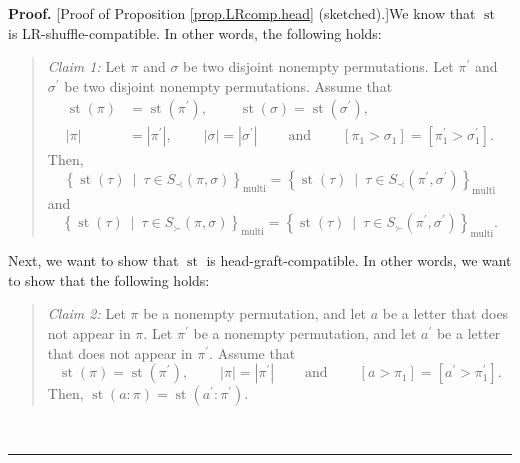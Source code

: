 \documentclass[numbers=enddot,12pt,final,onecolumn,notitlepage]{scrartcl}%
\theoremstyle{definition}
\newenvironment{statement}{\begin{quote}}{\end{quote}}
\newenvironment{proof}[1][Proof]{\noindent\textbf{#1.} }{\ \rule{0.5em}{0.5em}}
\newenvironment{verlong}{}{}
\begin{document}
\begin{verlong}
\begin{proof}
[Proof of Proposition \ref{prop.LRcomp.head} (sketched).]We know that
$\operatorname*{st}$ is LR-shuffle-compatible. In other words, the following holds:

\begin{statement}
\textit{Claim 1:} Let $\pi$ and $\sigma$ be two disjoint nonempty
permutations. Let $\pi^{\prime}$ and $\sigma^{\prime}$ be two disjoint
nonempty permutations. Assume that%
\begin{align*}
\operatorname*{st}\left(  \pi\right)   &  =\operatorname*{st}\left(
\pi^{\prime}\right)  ,\ \ \ \ \ \ \ \ \ \ \operatorname*{st}\left(
\sigma\right)  =\operatorname*{st}\left(  \sigma^{\prime}\right)  ,\\
\left\vert \pi\right\vert  &  =\left\vert \pi^{\prime}\right\vert
,\ \ \ \ \ \ \ \ \ \ \left\vert \sigma\right\vert =\left\vert \sigma^{\prime
}\right\vert \ \ \ \ \ \ \ \ \ \ \text{and}\ \ \ \ \ \ \ \ \ \ \left[  \pi
_{1}>\sigma_{1}\right]  =\left[  \pi_{1}^{\prime}>\sigma_{1}^{\prime}\right]
.
\end{align*}
Then,
\[
\left\{  \operatorname*{st}\left(  \tau\right)  \ \mid\ \tau\in S_{\prec
}\left(  \pi,\sigma\right)  \right\}  _{\operatorname*{multi}}=\left\{
\operatorname*{st}\left(  \tau\right)  \ \mid\ \tau\in S_{\prec}\left(
\pi^{\prime},\sigma^{\prime}\right)  \right\}  _{\operatorname*{multi}}%
\]
and%
\[
\left\{  \operatorname*{st}\left(  \tau\right)  \ \mid\ \tau\in S_{\succ
}\left(  \pi,\sigma\right)  \right\}  _{\operatorname*{multi}}=\left\{
\operatorname*{st}\left(  \tau\right)  \ \mid\ \tau\in S_{\succ}\left(
\pi^{\prime},\sigma^{\prime}\right)  \right\}  _{\operatorname*{multi}}.
\]

\end{statement}

Next, we want to show that $\operatorname*{st}$ is head-graft-compatible. In
other words, we want to show that the following holds:

\begin{statement}
\textit{Claim 2:} Let $\pi$ be a nonempty permutation, and let $a$ be a letter
that does not appear in $\pi$. Let $\pi^{\prime}$ be a nonempty permutation,
and let $a^{\prime}$ be a letter that does not appear in $\pi^{\prime}$.
Assume that%
\[
\operatorname*{st}\left(  \pi\right)  =\operatorname*{st}\left(  \pi^{\prime
}\right)  ,\ \ \ \ \ \ \ \ \ \ \left\vert \pi\right\vert =\left\vert
\pi^{\prime}\right\vert \ \ \ \ \ \ \ \ \ \ \text{and}%
\ \ \ \ \ \ \ \ \ \ \left[  a>\pi_{1}\right]  =\left[  a^{\prime}>\pi
_{1}^{\prime}\right]  .
\]
Then, $\operatorname*{st}\left(  a:\pi\right)  =\operatorname*{st}\left(
a^{\prime}:\pi^{\prime}\right)  $.
\end{statement}


\end{proof}
\end{verlong}
\end{document}
